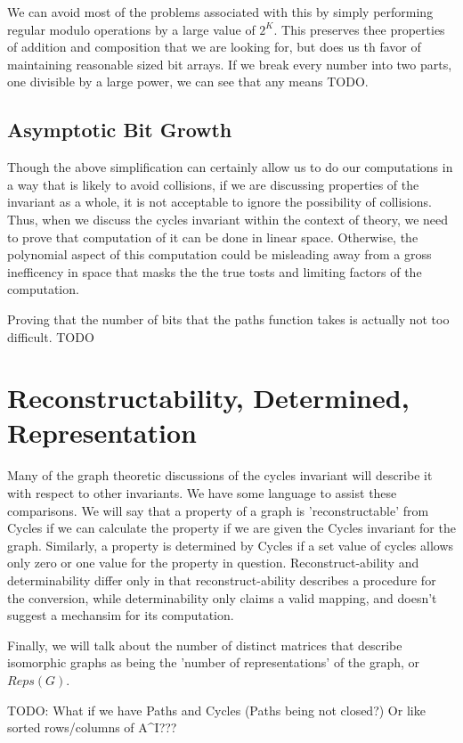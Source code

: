 \documentclass[11pt,a4paper]{report}
\begin{document}
We can avoid most of the problems associated with this by simply performing regular modulo operations by a large value of $2^K$.
This preserves thee properties of addition and composition that we are looking for, but does us th favor of maintaining reasonable sized bit arrays.
If we break every number into two parts, one divisible by a large power, we can see that any means TODO.

\subsection{Asymptotic Bit Growth}
Though the above simplification can certainly allow us to do our computations in a way that is likely to avoid collisions, if we are discussing properties of the invariant as a whole, it is not acceptable to ignore the possibility of collisions.
Thus, when we discuss the cycles invariant within the context of theory, we need to prove that computation of it can be done in linear space.
Otherwise, the polynomial aspect of this computation could be misleading away from a gross inefficency in space that masks the the true tosts and limiting factors of the computation.

Proving that the number of bits that the paths function takes is actually not too difficult.
TODO

\section{Reconstructability, Determined, Representation}
Many of the graph theoretic discussions of the cycles invariant will describe it with respect to other invariants. We have some language to assist these comparisons.
We will say that a property of a graph is 'reconstructable' from Cycles if we can calculate the property if we are given the Cycles invariant for the graph.
Similarly, a property is determined by Cycles if a set value of cycles allows only zero or one value for the property in question.
Reconstruct-ability and determinability differ only in that reconstruct-ability describes a procedure for the conversion, while determinability only claims a valid mapping, and doesn't suggest a mechansim for its computation.

Finally, we will talk about the number of distinct matrices that describe isomorphic graphs as being the 'number of representations' of the graph, or $Reps(G)$.

TODO: What if we have Paths and Cycles (Paths being not closed?) Or like sorted rows/columns of A^I???
\end{document}
